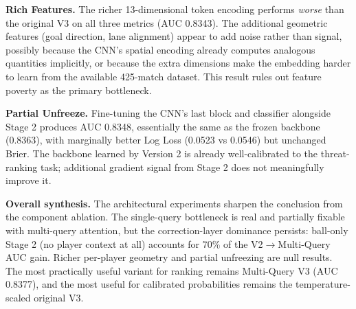 \textbf{Rich Features.} The richer 13-dimensional token encoding performs \emph{worse} than the original V3 on all three metrics (AUC 0.8343). The additional geometric features (goal direction, lane alignment) appear to add noise rather than signal, possibly because the CNN's spatial encoding already computes analogous quantities implicitly, or because the extra dimensions make the embedding harder to learn from the available 425-match dataset. This result rules out feature poverty as the primary bottleneck.

\textbf{Partial Unfreeze.} Fine-tuning the CNN's last block and classifier alongside Stage 2 produces AUC 0.8348, essentially the same as the frozen backbone (0.8363), with marginally better Log Loss (0.0523 vs 0.0546) but unchanged Brier. The backbone learned by Version 2 is already well-calibrated to the threat-ranking task; additional gradient signal from Stage 2 does not meaningfully improve it.

\textbf{Overall synthesis.} The architectural experiments sharpen the conclusion from the component ablation. The single-query bottleneck is real and partially fixable with multi-query attention, but the correction-layer dominance persists: ball-only Stage 2 (no player context at all) accounts for 70\% of the V2$\to$Multi-Query AUC gain. Richer per-player geometry and partial unfreezing are null results. The most practically useful variant for ranking remains Multi-Query V3 (AUC 0.8377), and the most useful for calibrated probabilities remains the temperature-scaled original V3.
